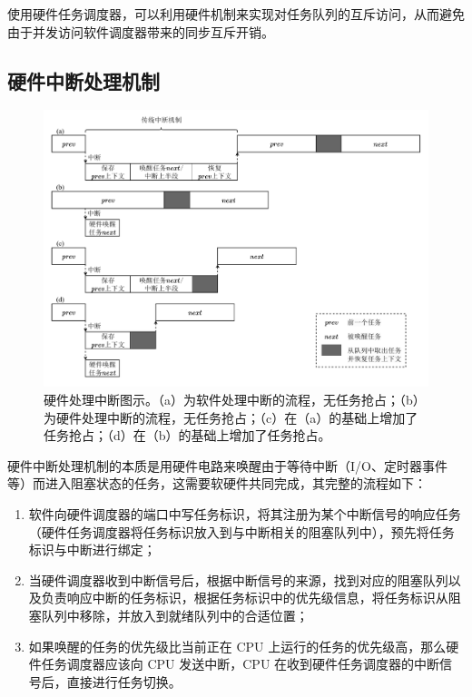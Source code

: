 使用硬件任务调度器，可以利用硬件机制来实现对任务队列的互斥访问，从而避免由于并发访问软件调度器带来的同步互斥开销。

\subsection{硬件中断处理机制}

\begin{figure}[htbp]
    \centering
    \includegraphics[width=\textwidth]{figures/pdfs/intr_demo.pdf}
    \caption[硬件处理中断图示]{硬件处理中断图示。（a）为软件处理中断的流程，无任务抢占；（b）为硬件处理中断的流程，无任务抢占；（c）在（a）的基础上增加了任务抢占；（d）在（b）的基础上增加了任务抢占。}
    \label{figure:intr_demo}
\end{figure}

硬件中断处理机制的本质是用硬件电路来唤醒由于等待中断（I/O、定时器事件等）而进入阻塞状态的任务，这需要软硬件共同完成，其完整的流程如下：

\begin{enumerate}
    \item 软件向硬件调度器的端口中写任务标识，将其注册为某个中断信号的响应任务（硬件任务调度器将任务标识放入到与中断相关的阻塞队列中），预先将任务标识与中断进行绑定；
    \item 当硬件调度器收到中断信号后，根据中断信号的来源，找到对应的阻塞队列以及负责响应中断的任务标识，根据任务标识中的优先级信息，将任务标识从阻塞队列中移除，并放入到就绪队列中的合适位置；
    \item 如果唤醒的任务的优先级比当前正在 CPU 上运行的任务的优先级高，那么硬件任务调度器应该向 CPU 发送中断，CPU 在收到硬件任务调度器的中断信号后，直接进行任务切换。
\end{enumerate}

